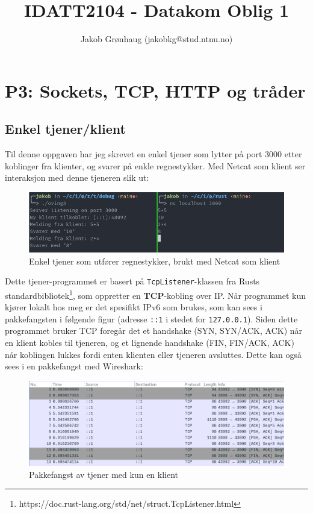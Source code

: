 \documentclass{article}
\title{IDATT2104 - Datakom Oblig 1}
\author{Jakob Grønhaug (jakobkg@stud.ntnu.no)}
\newcommand{\code}[1]{\colorbox{light-gray}{\texttt{#1}}}
\begin{document}
\maketitle

\tableofcontents

\section{P3: Sockets, TCP, HTTP og tråder}

\subsection{Enkel tjener/klient}

Til denne oppgaven har jeg skrevet en enkel tjener som lytter på port 3000 etter koblinger fra klienter, og svarer på enkle regnestykker. Med Netcat som klient ser interaksjon med denne tjeneren slik ut:

\begin{figure}[ht]
    \centering
    \includegraphics[width=.8\linewidth]{illustrasjoner/P3-enkel-terminal.png}
    \caption{Enkel tjener som utfører regnestykker, brukt med Netcat som klient}
\end{figure}

Dette tjener-programmet er basert på \code{TcpListener}-klassen fra Rusts standardbibliotek\footnote{https://doc.rust-lang.org/std/net/struct.TcpListener.html}, som oppretter en \textbf{TCP}-kobling over IP. Når programmet kun kjører lokalt hos meg er det spesifikt IPv6 som brukes, som kan sees i pakkefangsten i følgende figur (adresse \texttt{::1} i stedet for \texttt{127.0.0.1}). Siden dette programmet bruker TCP foregår det et handshake (SYN, SYN/ACK, ACK) når en klient kobles til tjeneren, og et lignende handshake (FIN, FIN/ACK, ACK) når koblingen lukkes fordi enten klienten eller tjeneren avsluttes. Dette kan også sees i en pakkefangst med Wireshark:

\begin{figure}[ht]
    \centering
    \includegraphics[width=.8\linewidth]{illustrasjoner/P3-enkel-capture.png}
    \caption{Pakkefangst av tjener med kun en klient}
    \label{fig2}
\end{figure}
\end{document}
